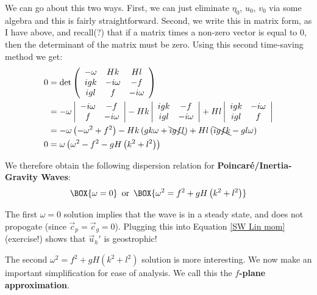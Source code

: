 We can go about this two ways. First, we can just eliminate $\eta_0$, $u_0$, $v_0$ via some algebra and this is fairly straightforward. Second, we write this in matrix form, as I have above, and recall(?) that if a matrix times a non-zero vector is equal to 0, then the determinant of the matrix must be zero. Using this second time-saving method we get:
\begin{align*}
   0 &=\det\left( \begin{array}{ccc}
        -\omega & Hk & Hl \\
        igk & -i\omega & -f\\
        igl & f & -i\omega
    \end{array} \right)
   \\
   &=-\omega \left|\begin{array}{cc}
        -i\omega & -f\\
        f & -i\omega
    \end{array} \right|
    -Hk \left|\begin{array}{cc}
        igk & -f\\
        igl & -i\omega
    \end{array} \right|
    +Hl \left|\begin{array}{cc}
        igk & -i\omega\\
        igl & f
    \end{array} \right|
    \\
    &=-\omega\left( -\omega^2+f^2 \right)
    -Hk \left( gk\omega +\bcancel{igfl} \right)
    +Hl \left( \bcancel{igfk} -gl\omega \right)
    \\
    0&=\omega\left( \omega^2 - f^2 - gH \left( k^2+l^2 \right) \right)
\end{align*}

We therefore obtain the following dispersion relation for \textbf{Poincaré/Inertia-Gravity Waves}:
\begin{align}
    \BOX{\omega=0}\,\text{ or }\,\BOX{\omega^2 = f^2 + gH \left( k^2 + l^2 \right)}
\end{align}

The first $\omega=0$ solution implies that the wave is in a steady state, and does not propogate (since $\vec{c}_p=\vec{c}_g=0$). Plugging this into Equation \ref{SW Lin mom} (exercise!) shows that $\vec{u}_h'$ is geostrophic!

The second $\omega^2=f^2+gH\left( k^2+l^2 \right)$ solution is more interesting. We now make an important simplification for ease of analysis. We call this the \textbf{$f$-plane approximation}.

